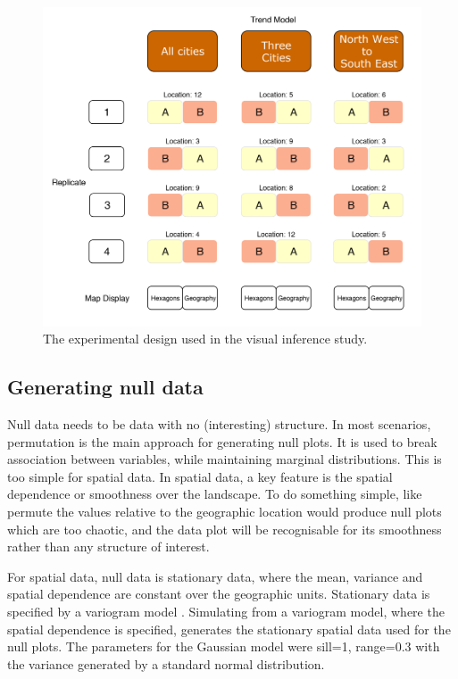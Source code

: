 \documentclass{monashthesis}
\begin{document}
\begin{figure}[H]
\centering
\includegraphics[width=16cm]{figures/04-experiment/experiment_design.pdf}
\caption{\label{fig:exp-design}The experimental design used in the visual inference study.}
\end{figure}

\hypertarget{generating-null-data}{%
\subsection{Generating null data}\label{generating-null-data}}

Null data needs to be data with no (interesting) structure. In most scenarios, permutation is the main approach for generating null plots. It is used to break association between variables, while maintaining marginal distributions. This is too simple for spatial data. In spatial data, a key feature is the spatial dependence or smoothness over the landscape. To do something simple, like permute the values relative to the geographic location would produce null plots which are too chaotic, and the data plot will be recognisable for its smoothness rather than any structure of interest.

For spatial data, null data is stationary data, where the mean, variance and spatial dependence are constant over the geographic units. Stationary data is specified by a variogram model \autocite{POG}. Simulating from a variogram model, where the spatial dependence is specified, generates the stationary spatial data used for the null plots. The parameters for the Gaussian model were sill=1, range=0.3 with the variance generated by a standard normal distribution.
\end{document}
